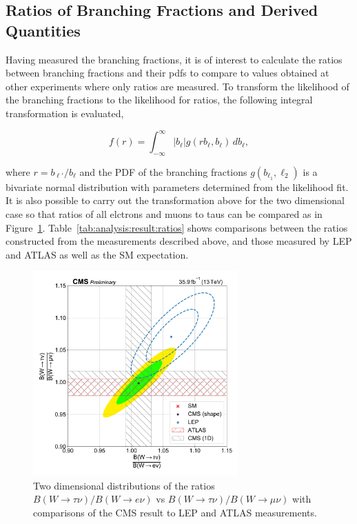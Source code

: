 \FloatBarrier

\subsection{Ratios of Branching Fractions and Derived Quantities}



Having measured the branching fractions, it is of interest to calculate the
ratios between branching fractions and their pdfs to compare to values obtained
at other experiments where only ratios are measured.  To transform the
likelihood of the branching fractions to the likelihood for ratios, the following
integral transformation is evaluated\cite{10.2307/2334671},

\begin{equation}
    f(r) = \int_{-\infty}^{\infty} \left|b_{\ell}\right| g(r b_{\ell}, b_{\ell}) \,db_{\ell},
\end{equation}

where $r = b_{\ell'}/b_{\ell}$ and the PDF of the branching fractions
$g(b_{\ell_{1}}, \ell_{2})$ is a bivariate normal distribution with parameters
determined from the likelihood fit.  It is also possible to carry out the
transformation above for the two dimensional case so that ratios of all
elctrons and muons to taus can be compared as in Figure~\ref{fig:ratios_2D}.
Table~\ref{tab:analysis:result:ratios} shows comparisons between the ratios constructed from
the measurements described above, and those measured by LEP and ATLAS as well
as the SM expectation. 

\begin{figure}[htb!]
    \begin{center}
    \includegraphics[width=0.7\textwidth]{chapters/Analysis/sectionResult/figures/result_contours_2d_ratio.pdf}
    \caption{Two dimensional distributions of the ratios $B(W\rightarrow
    \tau\nu)/B(W\rightarrow e\nu)$ vs $B(W\rightarrow \tau\nu)/B(W\rightarrow \mu\nu)$ 
    with comparisons of the CMS result to LEP and ATLAS measurements.}
    \label{fig:ratios_2D}
    \end{center}
\end{figure}

